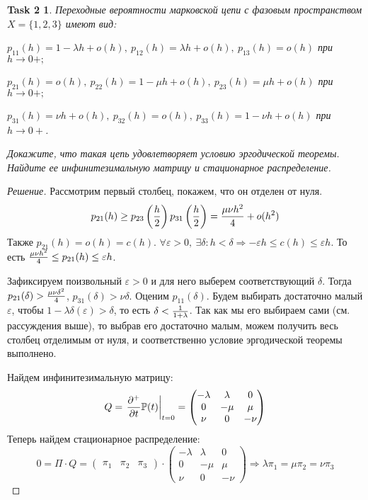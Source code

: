 \documentclass[12pt,a4paper]{extarticle}
\newtheorem*{task2}{Task 2}
\renewcommand*\dd{\mathop{}\!\partial}
\newcommand{\ra}{\rightarrow}
\newcommand{\e}{\varepsilon}
\begin{document}
	\begin{task2}
		Переходные вероятности марковской цепи с фазовым пространством $X =
		\{1, 2, 3\}$ имеют вид:
		
		$p_{11}(h) = 1 - \lambda h + o(h), ~p_{12}(h) = \lambda h + o(h), ~p_{13}(h) = o(h)$ при $h \ra 0+;$
		
		$p_{21}(h) = o(h), ~p_{22}(h) = 1 - \mu h + o(h), ~p_{23}(h) = \mu h + o(h)$ при $h \ra 0+;$
		
		$p_{31} (h) = \nu h + o(h), ~p_{32} (h) = o(h), ~p_{33}(h) = 1 - \nu h + o(h)$ при $h \ra 0+$.
		
		Докажите, что такая цепь удовлетворяет условию эргодической теоремы.
		Найдите ее инфинитезимальную матрицу и стационарное распределение.
	\end{task2}
	\begin{proof}[Решение]
		Рассмотрим первый столбец, покажем, что он отделен от нуля. 
		\[
			p_{21}(h) \geq p_{23}\left({h\over 2}\right) p_{31}\left({h\over 2}\right) = {\mu \nu h^2\over 4} + o(h^2)
		\]
		Также $p_{21}(h) = o(h) = c(h)$. $\forall \e > 0,~ \exists \delta : h < \delta \Rightarrow -\e h \leq c(h) \leq \e h$. То есть ${\mu \nu h^2\over 4} \leq  p_{21}(h) \leq \e h$. 
		
		Зафиксируем поизвольный $\e > 0$ и для него выберем соответствующий $\delta$. 
		Тогда $p_{21}(\delta) >{\mu \nu \delta^2\over 4}$, $p_{31}(\delta) > \nu \delta$. Оценим $p_{11}(\delta)$. Будем выбирать достаточно малый $\e$, чтобы $1 - \lambda \delta(\e) > \delta$, то есть $\delta < {1\over 1+\lambda}$. Так как мы его выбираем сами (см. рассуждения выше), то выбрав его достаточно малым, можем получить весь столбец отделимым от нуля, и соответственно условие эргодической теоремы выполнено.
		
		
		\vspace{\baselineskip}
		
		Найдем инфинитезимальную матрицу:
		\[
			Q = \left.{\dd^+ \over \dd t} \mathbb{P}(t) \right|_{t=0}
			=
			\begin{pmatrix}
				-\lambda & \lambda & 0
				\\
				0 & -\mu & \mu
				\\
				\nu & 0 & -\nu
			\end{pmatrix}
		\]
		Теперь найдем стационарное распределение:
		\[
			0 = \Pi \cdot Q
			=
			\begin{pmatrix}
				\pi_1 & \pi_2 & \pi_3
			\end{pmatrix}
			\cdot
			\begin{pmatrix}
			-\lambda & \lambda & 0
			\\
			0 & -\mu & \mu
			\\
			\nu & 0 & -\nu
			\end{pmatrix} 
			\Rightarrow
			\lambda \pi_1 = \mu \pi_2 = \nu \pi_3
		\]
		

\end{proof}
\end{document}
